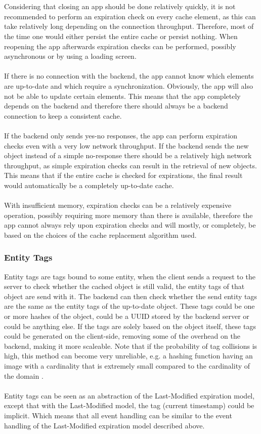 \documentclass[pdftex,a4paper,12pt,twoside]{report}
\begin{document}
\\\\
Considering that closing an app should be done relatively quickly, it is not recommended to perform an expiration check on every cache element, as this can take relatively long depending on the connection throughput. Therefore, most of the time one would either persist the entire cache or persist nothing. When reopening the app afterwards expiration checks can be performed, possibly asynchronous or by using a loading screen.
\\\\
If there is no connection with the backend, the app cannot know which elements are up-to-date and which require a synchronization. Obviously, the app will also not be able to update certain elements. This means that the app completely depends on the backend and therefore there should always be a backend connection to keep a consistent cache.
\\\\
If the backend only sends yes-no responses, the app can perform expiration checks even with a very low network throughput. If the backend sends the new object instead of a simple no-response there should be a relatively high network throughput, as simple expiration checks can result in the retrieval of new objects. This means that if the entire cache is checked for expirations, the final result would automatically be a completely up-to-date cache.
\\\\
With insufficient memory, expiration checks can be a relatively expensive operation, possibly requiring more memory than there is available, therefore the app cannot always rely upon expiration checks and will mostly, or completely, be based on the choices of the cache replacement algorithm used.
\subsubsection{Entity Tags}
Entity tags are tags bound to some entity, when the client sends a request to the server to check whether the cached object is still valid, the entity tags of that object are send with it. The backend can then check whether the send entity tags are the same as the entity tags of the up-to-date object. These tags could be one or more hashes of the object, could be a UUID stored by the backend server or could be anything else. If the tags are solely based on the object itself, these tags could be generated on the client-side, removing some of the overhead on the backend, making it more scaleable. Note that if the probability of tag collisions is high, this method can become very unreliable, e.g. a hashing function having an image with a cardinality that is extremely small compared to the cardinality of the domain \citep{http_etag}.
\\\\
Entity tags can be seen as an abstraction of the Last-Modified expiration model, except that with the Last-Modified model, the tag (current timestamp) could be implicit. Which means that all event handling can be similar to the event handling of the Last-Modified expiration model described above.
\end{document}
